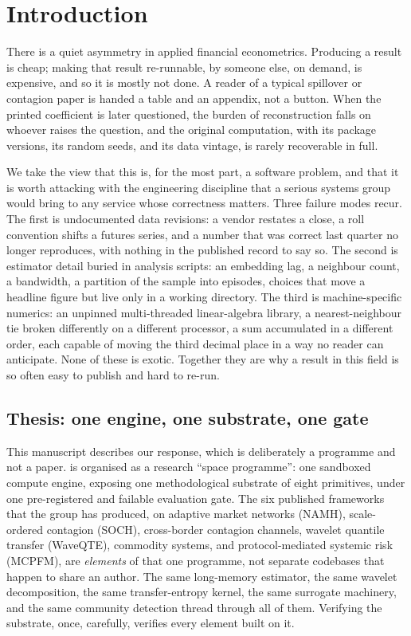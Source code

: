 \section{Introduction}
\label{sec:intro}

There is a quiet asymmetry in applied financial econometrics. Producing a result
is cheap; making that result re-runnable, by someone else, on demand, is
expensive, and so it is mostly not done. A reader of a typical spillover or
contagion paper is handed a table and an appendix, not a button. When the
printed coefficient is later questioned, the burden of reconstruction falls on
whoever raises the question, and the original computation, with its package
versions, its random seeds, and its data vintage, is rarely recoverable in full.

We take the view that this is, for the most part, a software problem, and that
it is worth attacking with the engineering discipline that a serious systems
group would bring to any service whose correctness matters. Three failure modes
recur. The first is undocumented data revisions: a vendor restates a close,
a roll convention shifts a futures series, and a number that was correct last
quarter no longer reproduces, with nothing in the published record to say so.
The second is estimator detail buried in analysis scripts: an embedding lag, a
neighbour count, a bandwidth, a partition of the sample into episodes, choices
that move a headline figure but live only in a working directory. The third is
machine-specific numerics: an unpinned multi-threaded linear-algebra library, a
nearest-neighbour tie broken differently on a different processor, a sum
accumulated in a different order, each capable of moving the third decimal place
in a way no reader can anticipate. None of these is exotic. Together they are
why a result in this field is so often easy to publish and hard to re-run.

\subsection{Thesis: one engine, one substrate, one gate}

This manuscript describes our response, which is deliberately a programme and not
a paper. \engine{} is organised as a research ``space programme'': one sandboxed
compute engine, exposing one methodological substrate of eight primitives, under
one pre-registered and failable evaluation gate. The six published frameworks
that the group has produced, on adaptive market networks (NAMH), scale-ordered
contagion (SOCH), cross-border contagion channels, wavelet quantile transfer
(WaveQTE), commodity systems, and protocol-mediated systemic risk (MCPFM), are
\emph{elements} of that one programme, not separate codebases that happen to
share an author. The same long-memory estimator, the same wavelet decomposition,
the same transfer-entropy kernel, the same surrogate machinery, and the same
community detection thread through all of them. Verifying the substrate, once,
carefully, verifies every element built on it.

